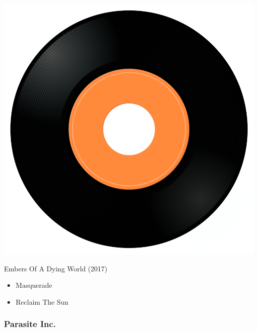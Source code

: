 \begin{minipage}[t]{0.25\textwidth}\vspace{0pt}
\captionsetup{type=figure}
\includegraphics[width=\textwidth]{Images/cover.png}
\caption*{Embers Of A Dying World (2017)}
\end{minipage}
\begin{minipage}[t]{0.25\textwidth}\vspace{0pt}
\begin{itemize}[nosep,leftmargin=1em,labelwidth=*,align=left]
	\setlength{\itemsep}{0pt}
	\item Masquerade
	\item Reclaim The Sun
\end{itemize}
\end{minipage}

\subsubsection{Parasite Inc.}

